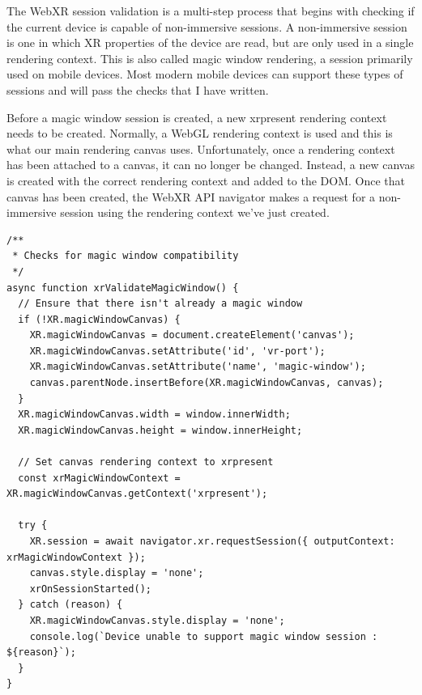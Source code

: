 \documentclass[onecolumn, draftclsnofoot,10pt, compsoc]{IEEEtran}
\begin{document}
    The WebXR session validation is a multi-step process that begins with checking if the current device is capable of non-immersive sessions. A non-immersive session is one in which XR properties of the device are read, but are only used in a single rendering context. This is also called magic window rendering, a session primarily used on mobile devices. Most modern mobile devices can support these types of sessions and will pass the checks that I have written.
    
    Before a magic window session is created, a new xrpresent rendering context needs to be created. Normally, a WebGL rendering context is used and this is what our main rendering canvas uses. Unfortunately, once a rendering context has been attached to a canvas, it can no longer be changed. Instead, a new canvas is created with the correct rendering context and added to the DOM. Once that canvas has been created, the WebXR API navigator makes a request for a non-immersive session using the rendering context we've just created. 
    \begin{lstlisting}
/**
 * Checks for magic window compatibility
 */
async function xrValidateMagicWindow() {
  // Ensure that there isn't already a magic window
  if (!XR.magicWindowCanvas) {
    XR.magicWindowCanvas = document.createElement('canvas');
    XR.magicWindowCanvas.setAttribute('id', 'vr-port');
    XR.magicWindowCanvas.setAttribute('name', 'magic-window');
    canvas.parentNode.insertBefore(XR.magicWindowCanvas, canvas);
  }
  XR.magicWindowCanvas.width = window.innerWidth;
  XR.magicWindowCanvas.height = window.innerHeight;

  // Set canvas rendering context to xrpresent
  const xrMagicWindowContext = XR.magicWindowCanvas.getContext('xrpresent');

  try {
    XR.session = await navigator.xr.requestSession({ outputContext: xrMagicWindowContext });
    canvas.style.display = 'none';
    xrOnSessionStarted();
  } catch (reason) {
    XR.magicWindowCanvas.style.display = 'none';
    console.log(`Device unable to support magic window session : ${reason}`);
  }
}
    \end{lstlisting}
    
\end{document}
